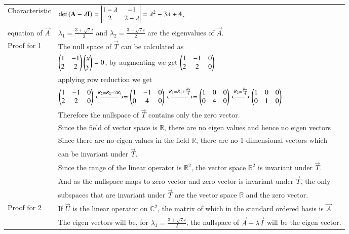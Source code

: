 \documentclass[journal,12pt]{IEEEtran}
\begin{document}
\begin{longtable}{|l|l|}
    \hline
    Characteristic & \qquad  \qquad \qquad \qquad $\det \left(\mathbf{A}-\lambda \mathbf{I}\right)=\begin{vmatrix}1-\lambda&-1\\2&2-\lambda\end{vmatrix}=\lambda^2-3\lambda+4$.\\
    equation of $\vec{A}$&\qquad  \qquad \qquad \qquad $\lambda_1=\frac{3+\sqrt{7}i}{2}$ and $\lambda_2=\frac{3-\sqrt{7}i}{2}$ are the eigenvalues of $\vec{A}$.\\
    \hline
    Proof for 1  & The null space of $\vec{T}$ can be calculated as\\
   & $\begin{pmatrix}1&-1\\2&2\end{pmatrix}\begin{pmatrix}x\\y\end{pmatrix}=0$, by augmenting we get $\begin{pmatrix}1&-1&0\\2&2&0\end{pmatrix}$ \\
   & applying row reduction we get\\
   & $\begin{pmatrix}1&-1&0\\2&2&0\end{pmatrix}\xleftrightarrow{R_2=R_2-2R_1}=\begin{pmatrix}1&-1&0\\0&4&0\end{pmatrix}\xleftrightarrow{R_1=R_1+\frac{R_2}{4}}=\begin{pmatrix}1&0&0\\0&4&0\end{pmatrix}\xleftrightarrow{R_2=\frac{R_2}{4}}\begin{pmatrix}1&0&0\\0&1&0\end{pmatrix}$\\
   & Therefore the nullspace of $\vec{T}$ contains only the zero vector.\\
   & Since the field of vector space is $\mathbb{R}$, there are no eigen values and hence no eigen vectors\\
   & Since there are no eigen values in the field $\mathbb{R}$, there are no 1-dimensional vectors which\\
   &can be invariant under $\vec{T}$.\\
   &Since the range of the linear operator is $\mathbb{R}^2$, the vector space $\mathbb{R}^2$ is invariant under $\vec{T}$.\\
   &And as the nullspace maps to zero vector and zero vector is invariant under $\vec{T}$, the only \\
   &subspaces that are invariant under $\vec{T}$ are the vector space $\mathbb{R}$ and the zero vector.\\
   \hline
   Proof for 2 & If $\vec{U}$ is the linear operator on $\mathbb{C}^2$, the matrix of which in the standard ordered basis is $\vec{A}$\\
   &The eigen vectors will be, for $\lambda_1=\frac{3+\sqrt{7}i}{2}$, the nullspace of $\vec{A}-\lambda\vec{I}$ will be the eigen vector.\\

\end{longtable}
\end{document}
